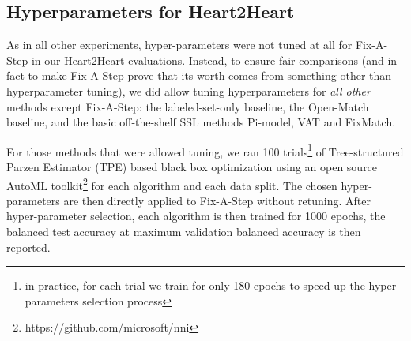 % 				
% 				

\clearpage
\subsection{Hyperparameters for Heart2Heart}
As in all other experiments, hyper-parameters were not tuned at all for Fix-A-Step in our Heart2Heart evaluations.
Instead, to ensure fair comparisons (and in fact to make Fix-A-Step prove that its worth comes from something other than hyperparameter tuning), we did allow tuning hyperparameters for \emph{all other} methods except Fix-A-Step: the labeled-set-only baseline, the Open-Match baseline, and the basic off-the-shelf SSL methods Pi-model, VAT and FixMatch. 

For those methods that were allowed tuning, we ran 100 trials\footnote{in practice, for each trial we train for only 180 epochs to speed up the hyper-parameters selection process} of Tree-structured Parzen Estimator (TPE) based black box optimization using an open source AutoML toolkit\footnote{https://github.com/microsoft/nni} for each algorithm and each data split. The chosen hyper-parameters are then directly applied to Fix-A-Step without retuning. After hyper-parameter selection, each algorithm is then trained for 1000 epochs, the balanced test accuracy at maximum validation balanced accuracy is then reported.


